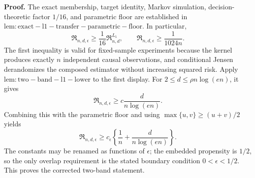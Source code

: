 \textbf{Proof.}
The exact membership, target identity, Markov simulation, decision-theoretic factor \(1/16\), and parametric floor are established in \(\mathrm{lem:exact-l1-transfer-parametric-floor}\).  In particular,
\[
 \mathfrak R_{n,d,\epsilon}
 \ge\frac1{16}\mathfrak R^{L_1}_{n,d},
 \qquad
 \mathfrak R_{n,d,\epsilon}\ge\frac1{1024n}.
\]
The first inequality is valid for fixed-sample experiments because the kernel produces exactly \(n\) independent causal observations, and conditional Jensen derandomizes the composed estimator without increasing squared risk.  Apply \(\mathrm{lem:two-band-l1-lower}\) to the first display.  For \(2\le d\le\rho n\log(en)\), it gives
\[
 \mathfrak R_{n,d,\epsilon}
 \ge c\frac d{n\log(en)}.
\]
Combining this with the parametric floor and using \(\max\{u,v\}\ge(u+v)/2\) yields
\[
 \mathfrak R_{n,d,\epsilon}
 \ge c_\epsilon\left\{\frac1n+\frac d{n\log(en)}\right\}.
\]
The constants may be renamed as functions of \(\epsilon\); the embedded propensity is \(1/2\), so the only overlap requirement is the stated boundary condition \(0<\epsilon<1/2\).  This proves the corrected two-band statement.